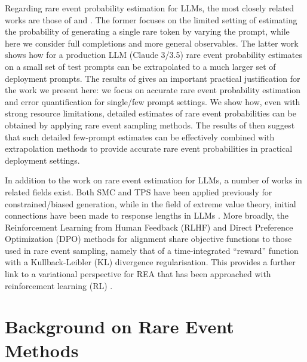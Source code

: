 \documentclass{article}
\begin{document}
Regarding rare event probability estimation for LLMs, the most closely related works are those of \cite{wu2025estimating} and \cite{jones2025forecasting}. The former focuses on the limited setting of estimating the probability of generating a single rare token by varying the prompt, while here we consider full completions and more general observables. The latter work shows how for a production LLM (Claude 3/3.5) rare event probability estimates on a small set of test prompts can be extrapolated to a much larger set of deployment prompts. The results of \cite{jones2025forecasting} gives an important practical justification for the work we present here: we focus on accurate rare event probability estimation and error quantification for single/few prompt settings. We show how, even with strong resource limitations, detailed estimates of rare event probabilities can be obtained by applying rare event sampling methods. The results of \cite{jones2025forecasting} then suggest that such detailed few-prompt estimates can be effectively combined with extrapolation methods to provide accurate rare event probabilities in practical deployment settings.

In addition to the work on rare event estimation for LLMs, a number of works in related fields exist. Both SMC \cite{lew2023sequential,loula2025syntactic} and TPS \cite{faria2024quest:, faria2025sample} have been applied previously for constrained/biased generation, while in the field of extreme value theory, initial connections have been made to response lengths in LLMs \cite{jiao2025analyzing}. More broadly,
the Reinforcement Learning from Human Feedback (RLHF) \cite{bai2022training} and Direct Preference Optimization (DPO) \cite{rafailov2023direct} methods for alignment share objective functions to those used in rare event sampling, namely that of a time-integrated ``reward'' function with a Kullback-Leibler (KL) divergence regularisation. This provides a further link to a variational perspective \cite{chetrite2015variational,jack2015effective} for REA that has been approached with reinforcement learning (RL) \cite{rose2021a-reinforcement,das2021reinforcement,gillman2024combining,pamulaparthy2025towards}.
\section{Background on Rare Event Methods}
\label{sec:theory}
\end{document}
